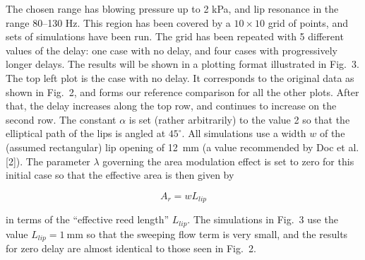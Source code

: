 
  The chosen range has blowing pressure up to 2 kPa, and lip resonance in the 
  range 80--130 Hz. This region has been covered by a $10 \times 10$ grid of 
  points, and sets of simulations have been run. The grid has been repeated 
  with 5 different values of the delay: one case with no delay, and four cases 
  with progressively longer delays. The results will be shown in a plotting 
  format illustrated in Fig.\ 3. The top left plot is the case with no delay. 
  It corresponds to the original data as shown in Fig.\ 2, and forms our 
  reference comparison for all the other plots. After that, the delay increases 
  along the top row, and continues to increase on the second row. The constant 
  $\alpha$ is set (rather arbitrarily) to the value 2 so that the elliptical 
  path of the lips is angled at $45^\circ$. All simulations use a width $w$ of 
  the (assumed rectangular) lip opening of 12~mm (a value recommended by Doc et 
  al. [2]). The parameter $\lambda$ governing the area modulation effect is set 
  to zero for this initial case so that the effective area is then given by 

  \begin{equation*}A_r=w L_{lip} \tag{5}\end{equation*} 

  \noindent{}in terms of the ``effective reed length'' $L_{lip}$. The 
  simulations in Fig.\ 3 use the value $L_{lip}=1 \mathrm{~mm}$ so that the 
  sweeping flow term is very small, and the results for zero delay are almost 
  identical to those seen in Fig.\ 2. 


